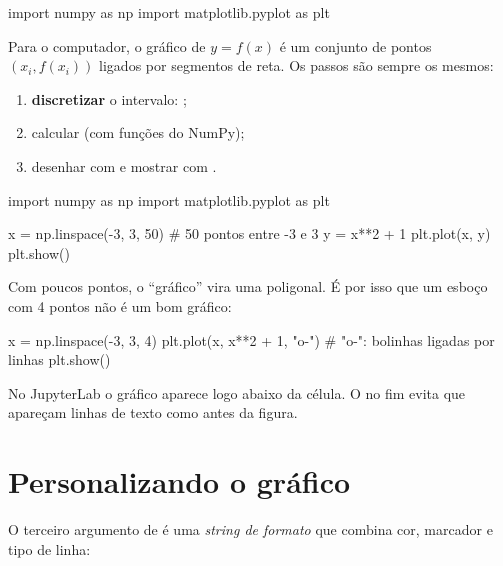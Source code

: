 \begin{codigo}
import numpy as np
import matplotlib.pyplot as plt
\end{codigo}

Para o computador, o gráfico de $y=f(x)$ é um conjunto de pontos $(x_i, f(x_i))$ ligados por segmentos de reta.
Os passos são sempre os mesmos:
\begin{enumerate}
  \item \textbf{discretizar} o intervalo: ;
  \item calcular  (com funções do NumPy);
  \item desenhar com  e mostrar com .
\end{enumerate}

\begin{entrada}
import numpy as np
import matplotlib.pyplot as plt

x = np.linspace(-3, 3, 50)     # 50 pontos entre -3 e 3
y = x**2 + 1
plt.plot(x, y)
plt.show()
\end{entrada}

Com poucos pontos, o ``gráfico'' vira uma poligonal. É por isso que um esboço com 4 pontos não é um bom gráfico:

\begin{entrada}
x = np.linspace(-3, 3, 4)
plt.plot(x, x**2 + 1, "o-")    # "o-": bolinhas ligadas por linhas
plt.show()
\end{entrada}

\begin{dica}
No JupyterLab o gráfico aparece logo abaixo da célula. O  no fim evita que apareçam linhas de
texto como  antes da figura.
\end{dica}

\section{Personalizando o gráfico}

O terceiro argumento de  é uma \emph{string de formato} que combina cor, marcador e tipo de linha:

